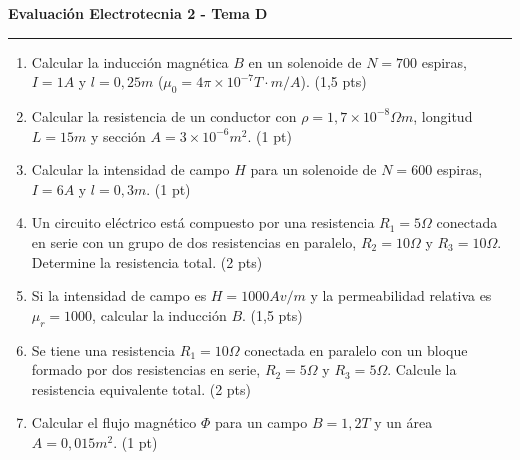 \documentclass[a4paper,11pt]{article}
\begin{document}
\begin{minipage}[t][0.48\textheight][t]{0.48\textwidth}
  \centering \textbf{Evaluación Electrotecnia 2 - Tema D} \\
  \rule{\textwidth}{0.4pt}
  \begin{enumerate}
    \item Calcular la inducción magnética $B$ en un solenoide de
      $N=700$ espiras, $I=1A$ y $l=0,25m$ ($\mu_0=4\pi \times 10^{-7}
      T\cdot m/A$). (1,5 pts)
    \item Calcular la resistencia de un conductor con $\rho=1,7
      \times 10^{-8} \Omega m$, longitud $L=15m$ y sección $A=3
      \times 10^{-6} m^2$. (1 pt)
    \item Calcular la intensidad de campo $H$ para un solenoide de
      $N=600$ espiras, $I=6A$ y $l=0,3m$. (1 pt)
    \item Un circuito eléctrico está compuesto por una resistencia
      $R_1=5\Omega$ conectada en serie con un grupo de dos
      resistencias en paralelo, $R_2=10\Omega$ y $R_3=10\Omega$.
      Determine la resistencia total. (2 pts)
    \item Si la intensidad de campo es $H=1000 Av/m$ y la
      permeabilidad relativa es $\mu_r=1000$, calcular la inducción
      $B$. (1,5 pts)
    \item Se tiene una resistencia $R_1=10\Omega$ conectada en
      paralelo con un bloque formado por dos resistencias en serie,
      $R_2=5\Omega$ y $R_3=5\Omega$. Calcule la resistencia
      equivalente total. (2 pts)
    \item Calcular el flujo magnético $\Phi$ para un campo $B=1,2T$ y
      un área $A=0,015m^2$. (1 pt)
  \end{enumerate}
\end{minipage}
\end{document}
